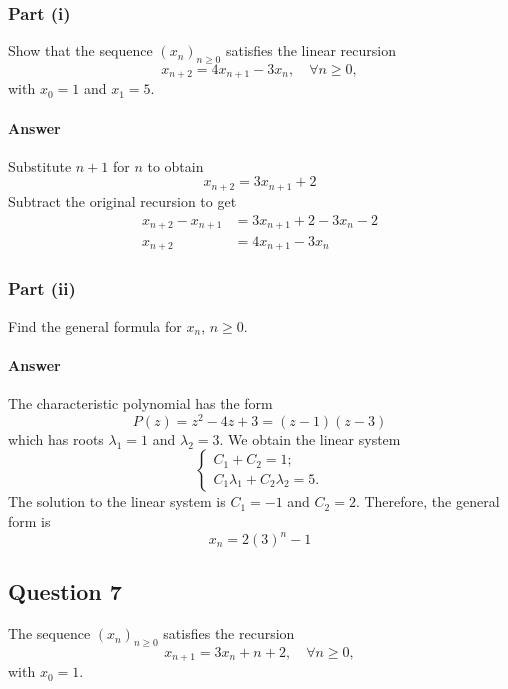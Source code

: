 \subsubsection{Part (i)}
Show that the sequence $ (x_n)_{n \geq 0} $ satisfies the linear recursion
\begin{equation*}
    x_{n + 2} = 4 x_{n + 1} - 3 x_n, \quad \forall n \geq 0,
\end{equation*}
with $ x_0 = 1 $ and $ x_1 = 5 $.

\paragraph{Answer}
Substitute $ n + 1 $ for $ n $ to obtain
\begin{equation*}
    x_{n + 2} = 3 x_{n + 1} + 2
\end{equation*}
Subtract the original recursion to get
\begin{align*}
    x_{n + 2} - x_{n + 1} &= 3 x_{n + 1} + 2 - 3 x_n - 2 \\
    x_{n + 2} &= 4 x_{n + 1} - 3 x_n
\end{align*}

\subsubsection{Part (ii)}
Find the general formula for $ x_n $, $ n \geq 0 $.

\paragraph{Answer}
The characteristic polynomial has the form
\begin{equation*}
    P(z) = z^2 - 4 z + 3 = (z - 1)(z - 3)
\end{equation*}
which has roots $ \lambda_1 = 1 $ and $ \lambda_2 = 3 $.
We obtain the linear system
\begin{equation*}
    \begin{cases}
        C_1 + C_2 = 1; \\
        C_1 \lambda_1 + C_2 \lambda_2 = 5.
    \end{cases}
\end{equation*}
The solution to the linear system is $ C_1 = -1 $ and $ C_2 = 2 $.
Therefore, the general form is
\begin{equation*}
    x_n = 2(3)^n - 1
\end{equation*}

\subsection{Question 7}
The sequence $ (x_n)_{n \geq 0} $ satisfies the recursion
\begin{equation*}
    x_{n + 1} = 3 x_n + n + 2, \quad \forall n \geq 0,
\end{equation*}
with $ x_0 = 1 $.

